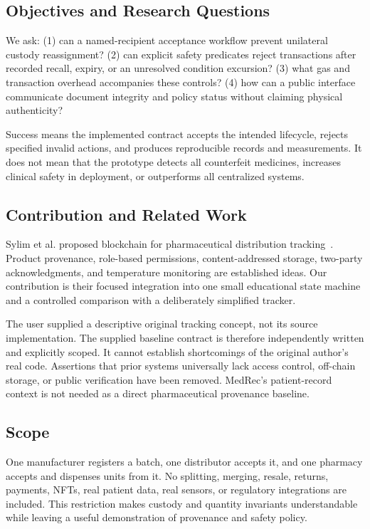 \subsection{Objectives and Research Questions}
We ask: (1) can a named-recipient acceptance workflow prevent unilateral custody reassignment? (2) can explicit safety predicates reject transactions after recorded recall, expiry, or an unresolved condition excursion? (3) what gas and transaction overhead accompanies these controls? (4) how can a public interface communicate document integrity and policy status without claiming physical authenticity?

Success means the implemented contract accepts the intended lifecycle, rejects specified invalid actions, and produces reproducible records and measurements. It does not mean that the prototype detects all counterfeit medicines, increases clinical safety in deployment, or outperforms all centralized systems.

\subsection{Contribution and Related Work}
Sylim et al. proposed blockchain for pharmaceutical distribution tracking~\cite{sylim}. Product provenance, role-based permissions, content-addressed storage, two-party acknowledgments, and temperature monitoring are established ideas. Our contribution is their focused integration into one small educational state machine and a controlled comparison with a deliberately simplified tracker.

The user supplied a descriptive original tracking concept, not its source implementation. The supplied baseline contract is therefore independently written and explicitly scoped. It cannot establish shortcomings of the original author's real code. Assertions that prior systems universally lack access control, off-chain storage, or public verification have been removed. MedRec's patient-record context is not needed as a direct pharmaceutical provenance baseline.

\subsection{Scope}
One manufacturer registers a batch, one distributor accepts it, and one pharmacy accepts and dispenses units from it. No splitting, merging, resale, returns, payments, NFTs, real patient data, real sensors, or regulatory integrations are included. This restriction makes custody and quantity invariants understandable while leaving a useful demonstration of provenance and safety policy.

